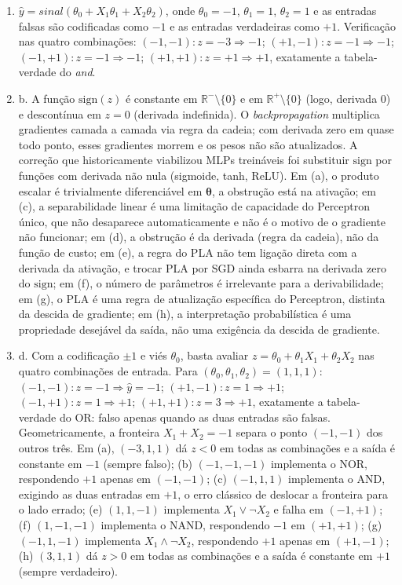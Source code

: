 \documentclass{dlproblemset}
\begin{document}
\begin{enumerate}[1)]
    \item $\hat{y}=sinal(\theta_0 + X_1\theta_1 + X_2\theta_2)$, onde $\theta_0=-1$, $\theta_1=1$, $\theta_2=1$ e as entradas falsas são codificadas como $-1$ e as entradas verdadeiras como $+1$. Verificação nas quatro combinações: $(-1,-1)\!: z=-3 \Rightarrow -1$; $(+1,-1)\!: z=-1 \Rightarrow -1$; $(-1,+1)\!: z=-1 \Rightarrow -1$; $(+1,+1)\!: z=+1 \Rightarrow +1$, exatamente a tabela-verdade do \textit{and}.

    \item b. A função $\mathrm{sign}(z)$ é constante em $\mathbb{R}^- \setminus \{0\}$ e em $\mathbb{R}^+ \setminus \{0\}$ (logo, derivada $0$) e descontínua em $z = 0$ (derivada indefinida). O \textit{backpropagation} multiplica gradientes camada a camada via regra da cadeia; com derivada zero em quase todo ponto, esses gradientes morrem e os pesos não são atualizados. A correção que historicamente viabilizou MLPs treináveis foi substituir $\mathrm{sign}$ por funções com derivada não nula (sigmoide, tanh, ReLU). Em (a), o produto escalar é trivialmente diferenciável em $\boldsymbol{\theta}$, a obstrução está na ativação; em (c), a separabilidade linear é uma limitação de capacidade do Perceptron único, que não desaparece automaticamente e não é o motivo de o gradiente não funcionar; em (d), a obstrução é da derivada (regra da cadeia), não da função de custo; em (e), a regra do PLA não tem ligação direta com a derivada da ativação, e trocar PLA por SGD ainda esbarra na derivada zero do $\mathrm{sign}$; em (f), o número de parâmetros é irrelevante para a derivabilidade; em (g), o PLA é uma regra de atualização específica do Perceptron, distinta da descida de gradiente; em (h), a interpretação probabilística é uma propriedade desejável da saída, não uma exigência da descida de gradiente.

    \item d. Com a codificação $\pm 1$ e viés $\theta_0$, basta avaliar $z = \theta_0 + \theta_1 X_1 + \theta_2 X_2$ nas quatro combinações de entrada. Para $(\theta_0, \theta_1, \theta_2) = (1, 1, 1)$: $(-1,-1)\!: z = -1 \Rightarrow \hat{y} = -1$; $(+1,-1)\!: z = 1 \Rightarrow +1$; $(-1,+1)\!: z = 1 \Rightarrow +1$; $(+1,+1)\!: z = 3 \Rightarrow +1$, exatamente a tabela-verdade do OR: falso apenas quando as duas entradas são falsas. Geometricamente, a fronteira $X_1 + X_2 = -1$ separa o ponto $(-1,-1)$ dos outros três. Em (a), $(-3, 1, 1)$ dá $z < 0$ em todas as combinações e a saída é constante em $-1$ (sempre falso); (b) $(-1, -1, -1)$ implementa o NOR, respondendo $+1$ apenas em $(-1,-1)$; (c) $(-1, 1, 1)$ implementa o AND, exigindo as duas entradas em $+1$, o erro clássico de deslocar a fronteira para o lado errado; (e) $(1, 1, -1)$ implementa $X_1 \lor \lnot X_2$ e falha em $(-1, +1)$; (f) $(1, -1, -1)$ implementa o NAND, respondendo $-1$ em $(+1,+1)$; (g) $(-1, 1, -1)$ implementa $X_1 \land \lnot X_2$, respondendo $+1$ apenas em $(+1,-1)$; (h) $(3, 1, 1)$ dá $z > 0$ em todas as combinações e a saída é constante em $+1$ (sempre verdadeiro).


\end{enumerate}
\end{document}
